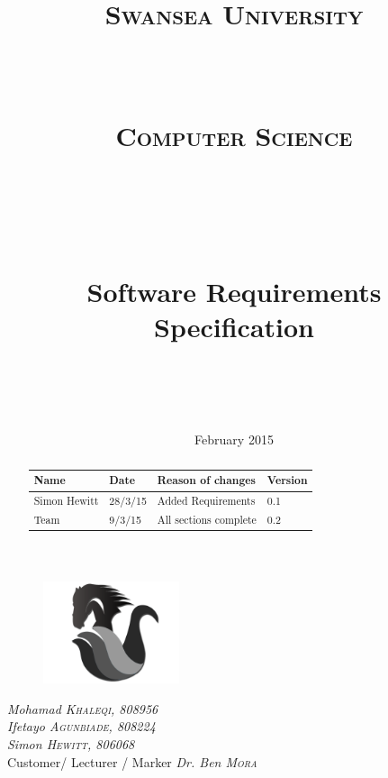 \documentclass[a4paper,10pt]{article}
\title{
\normalfont \normalsize 
\begin{LARGE} \textsc{Swansea University} \end{LARGE} \\ [15pt] %
\begin{large} \textsc{Computer Science} \end{large} \\ [15pt] %
\vspace{50px}
\horrule{0.5pt} \\[0.4cm] %
\begin{Huge}Software Requirements Specification \end{Huge}%
\horrule{2pt} \\[0.5cm] %
}
\author{} %
\date{} %
\begin{document}
\begin{titlepage}
\begin{figure}
  \centering
	\includegraphics[width=4cm]{swantech_chess_logo}
\end{figure}
\maketitle
\vspace{50px}
\begin{flushleft}
  \textit{Mohamad \textsc{Khaleqi}, 808956} \\
  \textit{Ifetayo \textsc{Agunbiade}, 808224} \\
 \textit{Simon \textsc{Hewitt}, 806068} \\
  \hfill Customer/ Lecturer / Marker \textit{Dr. Ben \textsc{Mora}}
\end{flushleft}
\vfill
\center \date{\normalsize February 2015} %

\end{titlepage}
\pagebreak


\tableofcontents
\pagebreak
\justify


\renewcommand{\abstractname}{Revision History}
\begin{abstract}
\begin{center}
  \begin{tabular}{ |  p{3cm} | p{3cm} |  p{5cm} | p{2cm} |}
    \hline
    Name & Date & Reason of changes & Version \\ \hline \hline
    Simon Hewitt & 28/3/15 & Added Requirements & 0.1 \\ \hline 
    Team & 9/3/15 & All sections complete & 0.2 \\
    \hline
  \end{tabular}
\end{center}
\end{abstract}
\end{document}
